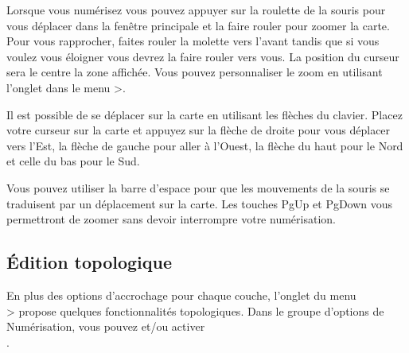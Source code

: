 Lorsque vous numérisez vous pouvez appuyer sur la roulette de la souris pour vous déplacer dans la fenêtre principale et la faire rouler pour zoomer la carte. Pour vous rapprocher, faites rouler la molette vers l'avant tandis que si vous voulez vous éloigner vous devrez la faire rouler vers vous. La position du curseur sera le centre la zone affichée. Vous pouvez personnaliser le zoom en utilisant l'onglet  dans le menu  >.



Il est possible de se déplacer sur la carte en utilisant les flèches du clavier. Placez votre curseur sur la carte et appuyez sur la flèche de droite pour vous déplacer vers l'Est, la flèche de gauche pour aller à l'Ouest, la flèche du haut pour le Nord et celle du bas pour le Sud.


Vous pouvez utiliser la barre d'espace pour que les mouvements de la souris se traduisent par un déplacement sur la carte. Les touches PgUp et PgDown vous permettront de zoomer sans devoir interrompre votre numérisation.

\subsection{Édition topologique}

En plus des options d'accrochage pour chaque couche, l'onglet  du menu\\  >  propose quelques fonctionnalités topologiques. Dans le groupe d'options de Numérisation, vous pouvez  et/ou activer\\ .

